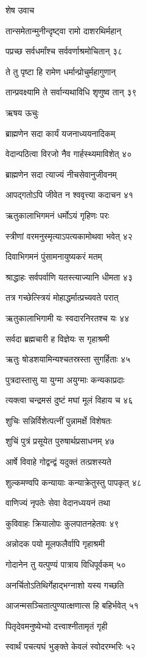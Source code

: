 शेष उवाच

तान्समेतान्मुनीन्दृष्ट्वा रामो दाशरथिर्महान्

पप्रच्छ सर्वधर्मांश्च सर्ववर्णाश्रमोचितान् ३८

ते तु पृष्टा हि रामेण धर्मान्प्रोचुर्महागुणान्

तान्प्रवक्ष्यामि ते सर्वान्यथाविधि शृणुष्व तान् ३९

ऋषय ऊचुः

ब्राह्मणेन सदा कार्यं यजनाध्ययनादिकम्

वेदान्पठित्वा विरजो नैव गार्हस्थ्यमाविशेत् ४०

ब्राह्मणेन सदा त्याज्यं नीचसेवानुजीवनम्

आपद्गतोऽपि जीवेत न श्ववृत्त्या कदाचन ४१

ऋतुकालाभिगमनं धर्मोऽयं गृहिणः परः

स्त्रीणां वरमनुस्मृत्याऽपत्यकामोथवा भवेत् ४२

दिवाभिगमनं पुंसामनायुष्यकरं मतम्

श्राद्धाहः सर्वपर्वाणि यतस्त्याज्यानि धीमता ४३

तत्र गच्छेत्स्त्रियं मोहाद्धर्मात्प्रच्यवते परात्

ऋतुकालाभिगामी यः स्वदारनिरतश्च यः ४४

सर्वदा ब्रह्मचारी ह विज्ञेयः स गृहाश्रमी

ऋतुः षोडशयामिन्यश्चतस्रस्ता सुगर्हिताः ४५

पुत्रदास्तासु या युग्मा अयुग्माः कन्यकाप्रदाः

त्यक्त्वा चन्द्रमसं दुष्टं मघां मूलं विहाय च ४६

शुचिः सन्निर्विशेत्पत्नीं पुन्नामर्क्षे विशेषतः

शुचिं पुत्रं प्रसूयेत पुरुषार्थप्रसाधनम् ४७

आर्षे विवाहे गोद्वन्द्वं यदुक्तं तत्प्रशस्यते

शुल्कमण्वपि कन्यायाः कन्याक्रेतुस्तु पापकृत् ४८

वाणिज्यं नृपतेः सेवा वेदानध्ययनं तथा

कुविवाहः क्रियालोपः कुलपातनहेतवः ४९

अन्नोदक पयो मूलफलैर्वापि गृहाश्रमी

गोदानेन तु यत्पुण्यं पात्राय विधिपूर्वकम् ५०

अनर्चितोऽतिथिर्गेहाद्भग्नाशो यस्य गच्छति

आजन्मसञ्चितात्पुण्यात्क्षणात्स हि बहिर्भवेत् ५१

पितृदेवमनुष्येभ्यो दत्त्वाश्नीतामृतं गृही

स्वार्थं पचत्यघं भुङ्क्ते केवलं स्वोदरम्भरिः ५२

